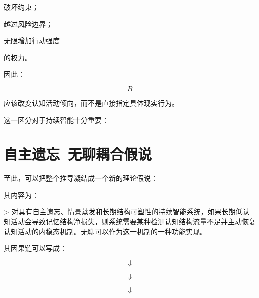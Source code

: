 破坏约束；

越过风险边界；

无限增加行动强度

的权力。

因此：

\[
B
\]

应该改变认知活动倾向，而不是直接指定具体现实行为。

这一区分对于持续智能十分重要：

\begin{statementbox}
\centering
{}
\end{statementbox}

\section{自主遗忘--无聊耦合假说}

至此，可以把整个推导凝结成一个新的理论假说：

\begin{statementbox}
\centering
{}
\end{statementbox}

其内容为：

> 对具有自主遗忘、情景蒸发和长期结构可塑性的持续智能系统，如果长期低认知活动会导致记忆结构净损失，则系统需要某种检测认知结构流量不足并主动恢复认知活动的内稳态机制。无聊可以作为这一机制的一种功能实现。

其因果链可以写成：

\begin{statementbox}
\centering
{}
\end{statementbox}

\[
\Downarrow
\]

\begin{statementbox}
\centering
{}
\end{statementbox}

\[
\Downarrow
\]

\begin{statementbox}
\centering
{}
\end{statementbox}

\[
\Downarrow
\]

\begin{statementbox}
\centering
{}
\end{statementbox}

